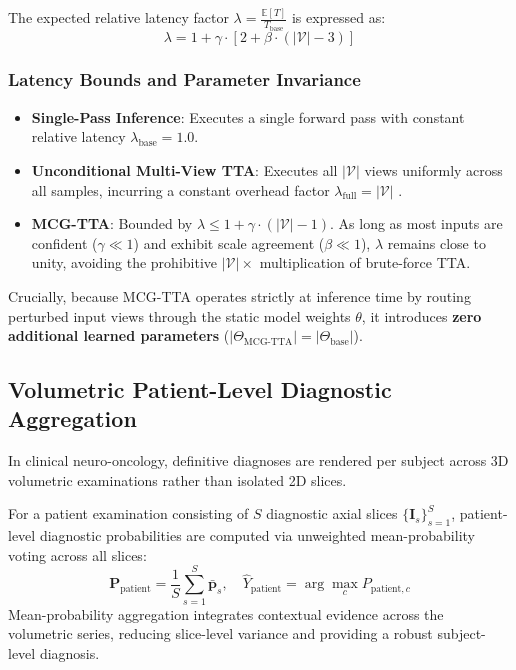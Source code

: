 The expected relative latency factor $\lambda = \frac{\mathbb{E}[T]}{T_{\text{base}}}$ is expressed as:
\begin{equation}
\lambda = 1 + \gamma \cdot \left[ 2 + \beta \cdot (|\mathcal{V}| - 3) \right]
\label{eq:latency}
\end{equation}

\subsubsection{Latency Bounds and Parameter Invariance}
\begin{itemize}
\item \textbf{Single-Pass Inference}: Executes a single forward pass with constant relative latency $\lambda_{\text{base}} = 1.0$.
\item \textbf{Unconditional Multi-View TTA}: Executes all $|\mathcal{V}|$ views uniformly across all samples, incurring a constant overhead factor $\lambda_{\text{full}} = |\mathcal{V}|$ \cite{58}.
\item \textbf{MCG-TTA}: Bounded by $\lambda \le 1 + \gamma \cdot (|\mathcal{V}| - 1)$. As long as most inputs are confident ($\gamma \ll 1$) and exhibit scale agreement ($\beta \ll 1$), $\lambda$ remains close to unity, avoiding the prohibitive $|\mathcal{V}|\times$ multiplication of brute-force TTA.
\end{itemize}

Crucially, because MCG-TTA operates strictly at inference time by routing perturbed input views through the static model weights $\theta$, it introduces \textbf{zero additional learned parameters} ($|\Theta_{\text{MCG-TTA}}| = |\Theta_{\text{base}}|$).

\subsection{Volumetric Patient-Level Diagnostic Aggregation}

In clinical neuro-oncology, definitive diagnoses are rendered per subject across 3D volumetric examinations rather than isolated 2D slices. 

For a patient examination consisting of $S$ diagnostic axial slices $\{\mathbf{I}_s\}_{s=1}^S$, patient-level diagnostic probabilities are computed via unweighted mean-probability voting across all slices:
\begin{equation}
\mathbf{P}_{\text{patient}} = \frac{1}{S} \sum_{s=1}^S \bar{\mathbf{p}}_s, \quad \hat{Y}_{\text{patient}} = \arg\max_{c} P_{\text{patient}, c}
\label{eq:patient_aggregation}
\end{equation}
Mean-probability aggregation integrates contextual evidence across the volumetric series, reducing slice-level variance and providing a robust subject-level diagnosis.
